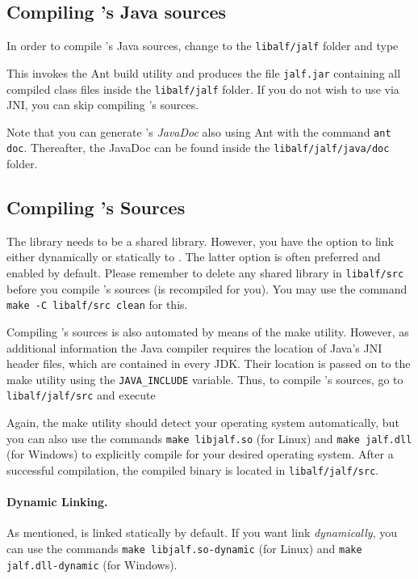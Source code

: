 \subsection{Compiling \jalf's Java sources}
In order to compile \jalf's Java sources, change to the \texttt{libalf/jalf} folder and type


This invokes the Ant build utility and produces the file \texttt{jalf.jar} containing all compiled class files inside the \texttt{libalf/jalf} folder. If you do not wish to use \jalf via JNI, you can skip compiling \jalf's \cpp sources.

Note that you can generate \jalf's \emph{JavaDoc} also using Ant with the command \texttt{ant doc}. Thereafter, the JavaDoc can be found inside the \texttt{libalf/jalf/java/doc} folder.

\subsection{\texorpdfstring{Compiling \jalf's \cpp Sources}{Compiling jALF's C++ Sources}}
The \jalf \cpp library needs to be a shared library. However, you have the option to link \libalf either dynamically or statically to \jalf. The latter option is often preferred and enabled by default. Please remember to delete any shared library in \texttt{libalf/src} before you compile \jalf's \cpp sources (\libalf is recompiled for you). You may use the command \texttt{make -C libalf/src clean} for this.

Compiling \jalf's \cpp sources is also automated by means of the make utility. However, as additional information the Java compiler requires the location of Java's JNI header files, which are contained in every JDK. Their location is passed on to the make utility using the \texttt{JAVA\_INCLUDE} variable. Thus, to compile \jalf's \cpp sources, go to \texttt{libalf/jalf/src} and execute


Again, the make utility should detect your operating system automatically, but you can also use the commands \texttt{make libjalf.so} (for Linux) and \texttt{make jalf.dll} (for Windows) to explicitly compile \jalf for your desired operating system. After a successful compilation, the compiled binary is located in \texttt{libalf/jalf/src}.

\paragraph{Dynamic Linking.}
As mentioned, \libalf is linked statically by default. If you want link \libalf \emph{dynamically}, you can use the commands \texttt{make libjalf.so-dynamic} (for Linux) and \texttt{make jalf.dll-dynamic} (for Windows).

